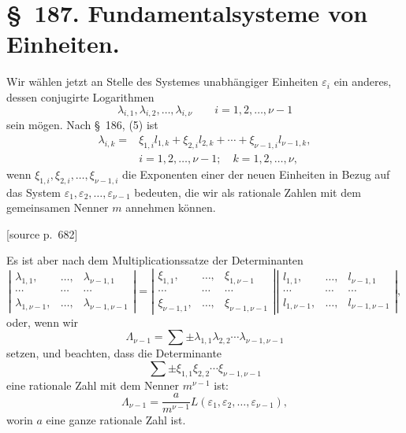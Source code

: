 \documentclass[11pt]{article}
\newcommand{\srcpage}[1]{\par\medskip\noindent\textsf{[source p.~#1]}\par\smallskip}
\begin{document}
\section*{\S~187. Fundamentalsysteme von Einheiten.}

Wir wählen jetzt an Stelle des Systemes unabhängiger Einheiten $\varepsilon_i$ ein anderes, dessen conjugirte Logarithmen
\begin{equation}
\lambda_{i,1},\lambda_{i,2},\ldots,\lambda_{i,\nu}
\qquad i=1,2,\ldots,\nu-1
\tag{1}
\end{equation}
sein mögen. Nach \S~186, (5) ist
\begin{equation}
\begin{array}{rl}
\lambda_{i,k}={}&\xi_{1,i}l_{1,k}+\xi_{2,i}l_{2,k}+\cdots+\xi_{\nu-1,i}l_{\nu-1,k},\\[2pt]
&i=1,2,\ldots,\nu-1;\quad k=1,2,\ldots,\nu,
\end{array}
\tag{2}
\end{equation}
wenn $\xi_{1,i},\xi_{2,i},\ldots,\xi_{\nu-1,i}$ die Exponenten einer der neuen Einheiten in Bezug auf das System $\varepsilon_1,\varepsilon_2,\ldots,\varepsilon_{\nu-1}$ bedeuten, die wir als rationale Zahlen mit dem gemeinsamen Nenner $m$ annehmen können.

\srcpage{682}
Es ist aber nach dem Multiplicationssatze der Determinanten
\begin{equation}
\left|\begin{array}{ccc}
\lambda_{1,1},&\ldots,&\lambda_{\nu-1,1}\\
\cdots&\cdots&\cdots\\
\lambda_{1,\nu-1},&\ldots,&\lambda_{\nu-1,\nu-1}
\end{array}\right|
=
\left|\begin{array}{ccc}
\xi_{1,1},&\ldots,&\xi_{1,\nu-1}\\
\cdots&\cdots&\cdots\\
\xi_{\nu-1,1},&\ldots,&\xi_{\nu-1,\nu-1}
\end{array}\right|
\left|\begin{array}{ccc}
l_{1,1},&\ldots,&l_{\nu-1,1}\\
\cdots&\cdots&\cdots\\
l_{1,\nu-1},&\ldots,&l_{\nu-1,\nu-1}
\end{array}\right|,
\tag{3}
\end{equation}
oder, wenn wir
\[
\Lambda_{\nu-1}=\sum\pm\lambda_{1,1}\lambda_{2,2}\cdots\lambda_{\nu-1,\nu-1}
\]
setzen, und beachten, dass die Determinante
\[
\sum\pm\xi_{1,1}\xi_{2,2}\cdots\xi_{\nu-1,\nu-1}
\]
eine rationale Zahl mit dem Nenner $m^{\nu-1}$ ist:
\begin{equation}
\Lambda_{\nu-1}=\frac{a}{m^{\nu-1}}L(\varepsilon_1,\varepsilon_2,\ldots,\varepsilon_{\nu-1}),
\tag{4}
\end{equation}
worin $a$ eine ganze rationale Zahl ist.
\end{document}
